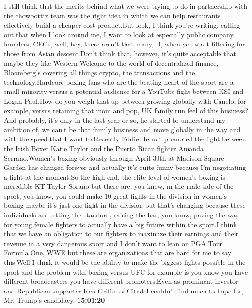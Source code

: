 \documentclass{article}%
\begin{document}
I still think that the merits behind what we were trying to do in partnership with the chowbottix team was the right idea in which we can help restaurants effectively build a cheaper cost product.But look, I think you're writing, calling out that when I look around me, I want to look at especially public company founders, CEOs, well, hey, there aren't that many, B, when you start filtering for those from Asian descent.Don't think that, however, it's quite acceptable that maybe they like Western Welcome to the world of decentralized finance, Bloomberg's covering all things crypto, the transactions and the technology.Hardcore boxing fans who are the beating heart of the sport are a small minority versus a potential audience for a YouTube fight between KSI and Logan Paul.How do you weigh that up between growing globally with Canelo, for example, versus retaining that mom and pop, UK family run feel of this business?And probably, it's only in the last year or so, he started to understand my ambition of, we can't be that family business and move globally in the way and with the speed that I want to.Recently Eddie Herndt promoted the fight between the Irish Boxer Katie Taylor and the Puerto Rican fighter Amanda Serrano.Women's boxing obviously through April 30th at Madison Square Garden has changed forever and actually it's quite funny because I'm negotiating a fight at the moment.So the high end, the elite level of women's boxing is incredible KT Taylor Sorano but there are, you know, in the male side of the sport, you know, you could make 10 great fights in the division in women's boxing maybe it's just one fight in the division but that's changing because these individuals are setting the standard, raising the bar, you know, paving the way for young female fighters to actually have a big future within the sport.I think that we have an obligation to our fighters to maximize their earnings and their revenue in a very dangerous sport and I don't want to lean on PGA Tour Formula One, WWE but these are organizations that are hard for me to say this.Well I think it would be the ability to make the biggest fights possible in the sport and the problem with boxing versus UFC for example is you know you have different broadcasters you have different promoters.Even as prominent investor and Republican supporter Ken Griffin of Citadel couldn't find much to hope for, Mr. Trump's candidacy.%
\textbf{15:01:20}%
\newline%
\end{document}
